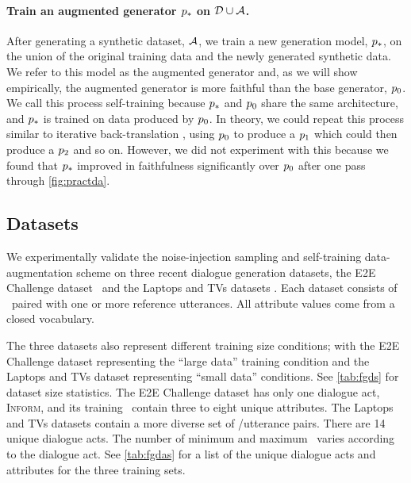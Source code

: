 \paragraph{{Train an augmented generator $p_*$ on $\mathcal{D} \cup
{\ensuremath{\mathcal{A}}}$.}} 
After generating a synthetic dataset, ${\mathcal{A}}$, we train a new
generation model, $p_*$, on the union of the original training data and the
newly generated synthetic data. We refer to this model as the augmented
generator and, as we will show empirically, the augmented generator is more
faithful than the base generator, $p_0$.  We call this process self-training
because $p_*$ and $p_0$ share the same architecture, and $p_*$ is
trained on data produced by $p_0$. In theory, we could repeat this process
similar to iterative back-translation \citep{hoang2018}, using $p_0$ to
produce a $p_1$ which could then produce a $p_2$ and so on. However, we
did not experiment with this because we found that $p_*$ improved in
faithfulness significantly over $p_0$ after one pass through
\autoref{fig:practda}.

\subsection{Datasets}



We experimentally validate the noise-injection sampling and self-training
data-augmentation scheme on three recent dialogue generation datasets, the E2E
Challenge dataset~\citep{novikova2017} and the Laptops and TVs datasets
\citep{wen2016}.  Each dataset consists of \meaningrepresentations~paired with
one or more reference utterances.  All attribute values come from a closed
vocabulary.

The three datasets also represent different training size conditions; with the
E2E Challenge dataset representing the ``large data'' training condition and
the Laptops and TVs dataset representing ``small data'' conditions. See
\autoref{tab:fgds} for dataset size statistics.  The E2E Challenge dataset has
only one dialogue act, \textsc{Inform}, and its training
\meaningrepresentations~contain three to eight unique attributes.  The Laptops
and TVs datasets contain a more diverse set of \meaningrepresentation/utterance
pairs. There are 14 unique dialogue acts.  The number of minimum and maximum
\attributes~varies according to the dialogue act. See \autoref{tab:fgdas} for a
list of the unique dialogue acts and attributes for the three training sets. 

